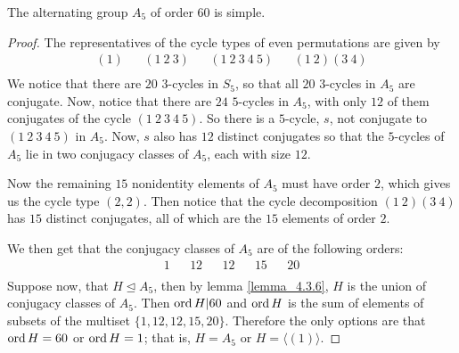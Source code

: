 \begin{theorem}\label{theorem_4.3.7}
  The alternating group $A_5$ of order $60$ is simple.
\end{theorem}
\begin{proof}
  The representatives of the cycle types of even permutations are given by
  \begin{align*}
    (1) && (1 \ 2 \ 3) && (1 \ 2 \ 3 \ 4 \ 5) && (1 \ 2)(3 \ 4)     \\
  \end{align*}
  We notice that there are $20$  $3$-cycles in $S_5$, so that all $20$
  $3$-cycles in  $A_5$ are conjugate. Now, notice that there are $24$
  $5$-cycles in $A_5$, with only $12$ of them conjugates of the cycle  $(1 \ 2
  \ 3 \ 4 \ 5)$. So there is a $5$-cycle, $s$, not conjugate to $(1 \ 2 \ 3 \
  4 \ 5)$ in $A_5$. Now, $s$ also has  $12$ distinct conjugates so that the
  $5$-cycles of  $A_5$ lie in two conjugacy classes of  $A_5$, each with size
  $12$.

  Now the remaining $15$ nonidentity elements of  $A_5$ must have order $2$,
  which gives us the cycle type  $(2,2)$. Then notice that the cycle
  decomposition $(1 \ 2)(3 \ 4)$ has $15$ distinct conjugates, all of which
  are the  $15$ elements of order  $2$.

  We then get that the conjugacy classes of  $A_5$ are of the following
  orders:
  \begin{align*}
    1  &&  12  &&  12  &&  15  &&  20  \\
  \end{align*}
  Suppose now, that $H \unlhd A_5$, then by lemma \ref{lemma_4.3.6}, $H$ is the
  union of conjugacy classes of  $A_5$. Then $\operatorname{ord}{H}|60$ and $\operatorname{ord}{H}$ is
  the sum of elements of subsets of the multiset $\{1, 12, 12, 15, 20\}$.
  Therefore the only options are that $\operatorname{ord}{H}=60$ or $\operatorname{ord}{H}=1$; that is,
  $H=A_5$ or $H=\langle (1) \rangle$.
\end{proof}
